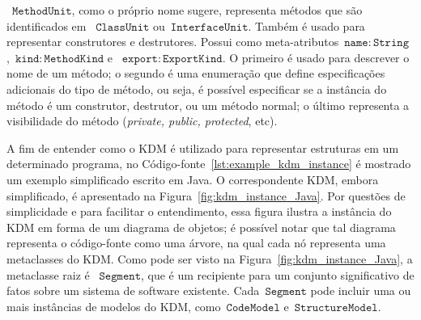
~$\mathtt{MethodUnit}$, como o próprio nome sugere, representa métodos que são identificados em ~$\mathtt{ClassUnit}$ ou~$\mathtt{InterfaceUnit}$. Também é usado para representar construtores e destrutores. Possui como meta-atributos~$\mathtt{name:String}$,~$\mathtt{kind:MethodKind}$ e ~$\mathtt{export:ExportKind}$. O primeiro é usado para descrever o nome de um método; o segundo é uma enumeração que define especificações adicionais do tipo de método, ou seja, é possível especificar se a instância do método é um construtor, destrutor, ou um método normal; o último representa a visibilidade do método (\textit{private, public, protected}, etc).


A fim de entender como o KDM é utilizado para representar estruturas em um determinado programa, no Código-fonte~\ref{lst:example_kdm_instance} é mostrado um exemplo simplificado escrito em Java. O correspondente KDM, embora simplificado, é apresentado na Figura~\ref{fig:kdm_instance_Java}. Por questões de simplicidade e para facilitar o entendimento, essa figura ilustra a instância do KDM em forma de um diagrama de objetos; é possível notar que tal diagrama representa o código-fonte como uma árvore, na qual cada nó representa uma metaclasses do KDM. Como pode ser visto na Figura~\ref{fig:kdm_instance_Java}, a metaclasse raiz é ~$\mathtt{Segment}$, que é um recipiente para um conjunto significativo de fatos sobre um sistema de software existente. Cada~$\mathtt{Segment}$ pode incluir uma ou mais instâncias de modelos do KDM, como~$\mathtt{CodeModel}$ e~$\mathtt{StructureModel}$.

